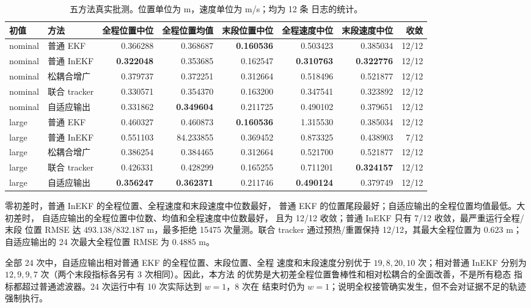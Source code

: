 \documentclass[11pt,a4paper]{ctexart}
\begin{document}
\begin{table}[H]
\centering
\scriptsize
\setlength{\tabcolsep}{3.2pt}
\caption{五方法真实批测。位置单位为 m，速度单位为 m/s；均为 12 条
日志的统计。}
\begin{tabular}{llrrrrrr}
\toprule
初值 & 方法 & 全程位置中位 & 全程位置均值 & 末段位置中位 &
全程速度中位 & 末段速度中位 & 收敛\\
\midrule
nominal & 普通 EKF & 0.366288 & 0.368687 & \textbf{0.160536} &
0.503423 & 0.385034 & 12/12\\
nominal & 普通 InEKF & \textbf{0.322048} & 0.353685 & 0.162547 &
\textbf{0.310763} & \textbf{0.322776} & 12/12\\
nominal & 松耦合增广 & 0.379737 & 0.372251 & 0.312664 &
0.518496 & 0.521877 & 12/12\\
nominal & 联合 tracker & 0.330571 & 0.354370 & 0.163200 &
0.347541 & 0.323892 & 12/12\\
nominal & 自适应输出 & 0.331862 & \textbf{0.349604} & 0.211725 &
0.490102 & 0.379651 & 12/12\\
\midrule
large & 普通 EKF & 0.460327 & 0.460873 & \textbf{0.160536} &
1.315530 & 0.385034 & 12/12\\
large & 普通 InEKF & 0.551103 & 84.233855 & 0.369452 &
0.873325 & 0.438903 & 7/12\\
large & 松耦合增广 & 0.386254 & 0.384465 & 0.312664 &
0.521700 & 0.521877 & 12/12\\
large & 联合 tracker & 0.426331 & 0.428299 & 0.165255 &
0.711201 & \textbf{0.324157} & 12/12\\
large & 自适应输出 & \textbf{0.356247} & \textbf{0.362371} & 0.211746 &
\textbf{0.490124} & 0.379749 & 12/12\\
\bottomrule
\end{tabular}
\label{tab:all-real}
\end{table}

零初差时，普通 InEKF 的全程位置、全程速度和末段速度中位数最好，
普通 EKF 的位置尾段最好；自适应输出的全程位置均值最低。大初差时，
自适应输出的全程位置中位数、均值和全程速度中位数最好，
且为 12/12 收敛；普通 InEKF 只有 7/12 收敛，最严重运行全程/末段
位置 RMSE 达 $493.138/832.187$ m，最多拒绝 15475 次量测。联合
tracker 通过预热/重置保持 12/12，其最大全程位置为 $0.623$ m；
自适应输出的 24 次最大全程位置 RMSE 为 $0.4885$ m。

全部 24 次中，自适应输出相对普通 EKF 的全程位置、末段位置、全程
速度和末段速度分别优于 $19,8,20,10$ 次；相对普通 InEKF 分别为
$12,9,9,7$ 次（两个末段指标各另有 3 次相同）。因此，本方法
的优势是大初差全程位置鲁棒性和相对松耦合的全面改善，不是所有稳态
指标都超过普通滤波器。24 次运行中有 10 次实际达到 $w=1$，8 次在
结束时仍为 $w=1$；说明全权接管确实发生，但不会对证据不足的轨迹
强制执行。
\end{document}
